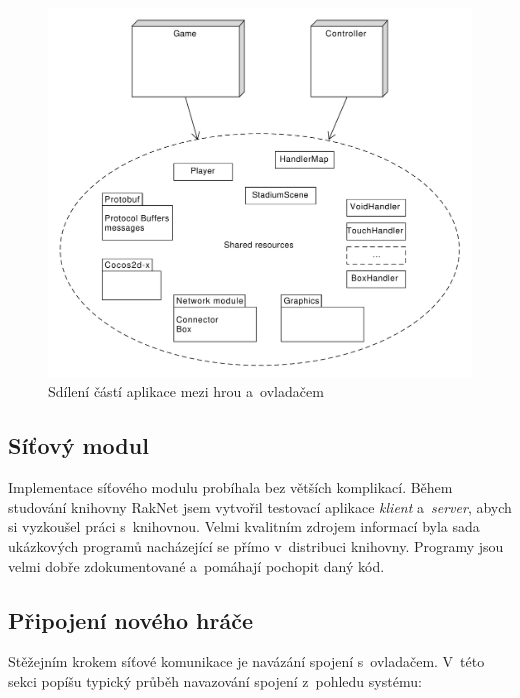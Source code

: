 \documentclass[thesis=B,czech,hidelinks]{FITthesis}[2012/06/26] %
\begin{document}
\begin{figure}[h]
\includegraphics[width=\textwidth]{source_sharing}
\caption{Sdílení částí aplikace mezi hrou a~ovladačem}
\label{picture:source_sharing}
\end{figure}


\subsection{Síťový modul}

Implementace síťového modulu probíhala bez větších komplikací. Během studování knihovny RakNet jsem vytvořil testovací aplikace \textit{klient} a~\textit{server}, abych si vyzkoušel práci s~knihovnou. Velmi kvalitním zdrojem informací byla sada ukázkových programů nacházející se přímo v~distribuci knihovny. Programy jsou velmi dobře zdokumentované a~pomáhají pochopit daný kód.

\subsection{Připojení nového hráče}

Stěžejním krokem síťové komunikace je navázání spojení s~ovladačem. V~této sekci popíšu typický průběh navazování spojení z~pohledu systému:
\end{document}
